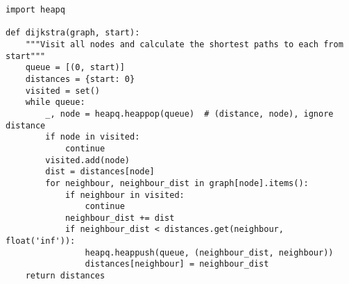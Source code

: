 \begin{lstlisting}[firstnumber=1, caption={Dijkstra's algorithm implementation. Credits: \href{https://stackoverflow.com/a/57234618}{stackoverflow}.}]
import heapq

def dijkstra(graph, start):
    """Visit all nodes and calculate the shortest paths to each from start"""
    queue = [(0, start)]
    distances = {start: 0}
    visited = set()
    while queue:
        _, node = heapq.heappop(queue)  # (distance, node), ignore distance
        if node in visited:
            continue
        visited.add(node)
        dist = distances[node]
        for neighbour, neighbour_dist in graph[node].items():
            if neighbour in visited:
                continue
            neighbour_dist += dist
            if neighbour_dist < distances.get(neighbour, float('inf')):
                heapq.heappush(queue, (neighbour_dist, neighbour))
                distances[neighbour] = neighbour_dist
    return distances	
\end{lstlisting}